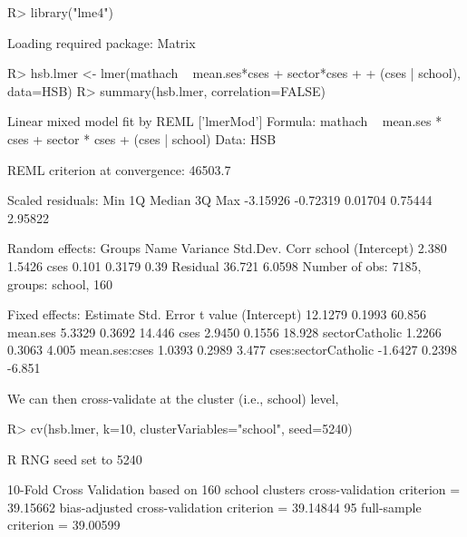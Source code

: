 \documentclass[
]{jss}
\begin{document}
\begin{CodeChunk}
\begin{CodeInput}
R> library("lme4")
\end{CodeInput}
\begin{CodeOutput}
Loading required package: Matrix
\end{CodeOutput}
\begin{CodeInput}
R> hsb.lmer <- lmer(mathach ~ mean.ses*cses + sector*cses
+                    + (cses | school), data=HSB)
R> summary(hsb.lmer, correlation=FALSE)
\end{CodeInput}
\begin{CodeOutput}
Linear mixed model fit by REML ['lmerMod']
Formula: mathach ~ mean.ses * cses + sector * cses + (cses | school)
   Data: HSB

REML criterion at convergence: 46503.7

Scaled residuals: 
     Min       1Q   Median       3Q      Max 
-3.15926 -0.72319  0.01704  0.75444  2.95822 

Random effects:
 Groups   Name        Variance Std.Dev. Corr
 school   (Intercept)  2.380   1.5426       
          cses         0.101   0.3179   0.39
 Residual             36.721   6.0598       
Number of obs: 7185, groups:  school, 160

Fixed effects:
                    Estimate Std. Error t value
(Intercept)          12.1279     0.1993  60.856
mean.ses              5.3329     0.3692  14.446
cses                  2.9450     0.1556  18.928
sectorCatholic        1.2266     0.3063   4.005
mean.ses:cses         1.0393     0.2989   3.477
cses:sectorCatholic  -1.6427     0.2398  -6.851
\end{CodeOutput}
\end{CodeChunk}

We can then cross-validate at the cluster (i.e., school) level,

\begin{CodeChunk}
\begin{CodeInput}
R> cv(hsb.lmer, k=10, clusterVariables="school", seed=5240)
\end{CodeInput}
\begin{CodeOutput}
R RNG seed set to 5240
\end{CodeOutput}
\begin{CodeOutput}
10-Fold Cross Validation based on 160 {school} clusters
cross-validation criterion = 39.15662
bias-adjusted cross-validation criterion = 39.14844
95%
full-sample criterion = 39.00599 
\end{CodeOutput}
\end{CodeChunk}
\end{document}

